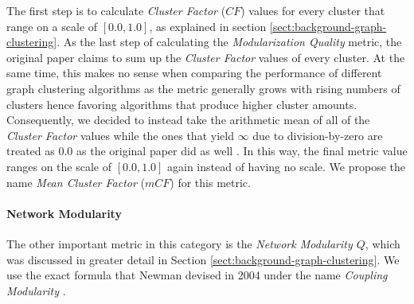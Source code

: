 \documentclass[12pt,a4paper]{report}
\begin{document}
The first step is to calculate \textit{Cluster Factor} ($CF$) values for every
cluster that range on a scale of \([0.0, 1.0]\), as explained in section
\ref{sect:background-graph-clustering}. As the last step of calculating the
\textit{Modularization Quality} metric, the original paper claims to sum up the
\textit{Cluster Factor} values of every cluster. At the same time, this makes no sense
when comparing the performance of different graph clustering algorithms as the
metric generally grows with rising numbers of clusters hence favoring
algorithms that produce higher cluster amounts. Consequently, we decided to
instead take the arithmetic mean of all of the \textit{Cluster Factor} values
while the ones that yield $\infty$ due to division\hyp by\hyp zero are treated
as $0.0$ as the original paper did as well \cite{mitchell2006automatic}. In
this way, the final metric value ranges on the scale of \([0.0, 1.0]\) again
instead of having no scale. We propose the name \textit{Mean Cluster Factor}
($mCF$) for this metric.

\paragraph{Network Modularity}
The other important metric in this category is the \textit{Network Modularity $Q$},
which was discussed in greater detail in Section \ref{sect:background-graph-clustering}.
We use the exact formula that Newman devised in 2004 under the name
\textit{Coupling Modularity} \cite{newman2004fast}.
\end{document}
